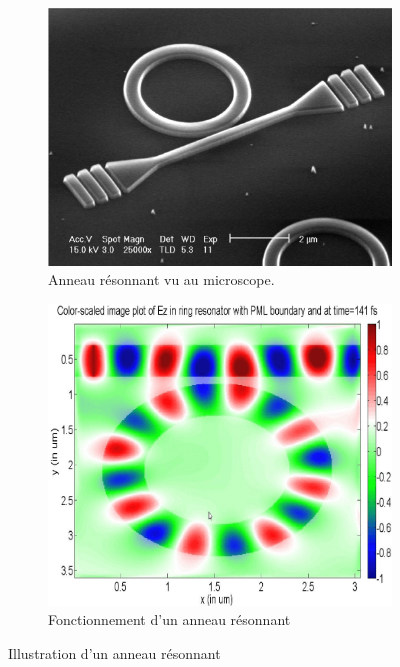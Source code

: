         \begin{figure}[t!]
            \centering
            \begin{subfigure}[t]{0.48\textwidth}
                \centering
                \includegraphics[width=\linewidth]{images/edl_photo_ring1.png}
                \caption{\label{fig:edl_photo_ring1} Anneau résonnant vu au microscope.}
            \end{subfigure}\hfill
            \begin{subfigure}[t]{0.40\textwidth}
                \centering
                \includegraphics[width=\linewidth]{images/edl_photo_ring2.png}
                \caption{\label{fig:edl_photo_ring2} Fonctionnement d'un anneau résonnant}
            \end{subfigure}
            \caption{\label{fig:edl_photo_ring_prez} Illustration d'un anneau résonnant}
        \end{figure}
        
